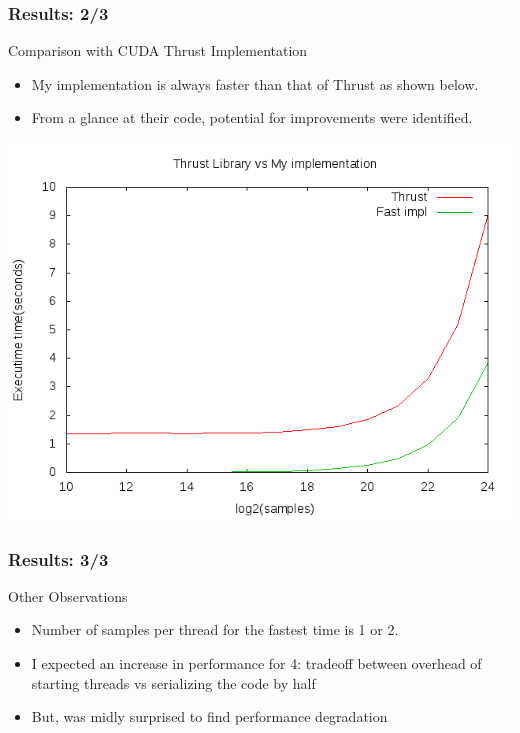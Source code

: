 \documentclass[mathserif]{beamer}
\begin{document}
\begin{frame}                                                                                                                                                                          
\frametitle{Results: 2/3}

\begin{block}{Comparison with CUDA Thrust Implementation}
\begin{itemize}
\item My implementation is always faster than that of Thrust as shown below. 
\item From a glance at their code, potential for improvements were identified.  
\end{itemize}
\end{block}
\begin{center}
\includegraphics[scale=0.3]{thrust_gpu.png}
\end{center}
\end{frame}             
 
\begin{frame}                                                                                                                                                                          
\frametitle{Results: 3/3}
\begin{block}{Other Observations}
\begin{itemize}
\item Number of samples per thread for the fastest time is 1 or 2.  
\item I expected an increase in performance for 4: tradeoff between overhead of starting threads vs serializing the code by half 
\item But, was midly surprised to find performance degradation 
\end{itemize}
\end{block}
\end{frame}             
\end{document}
